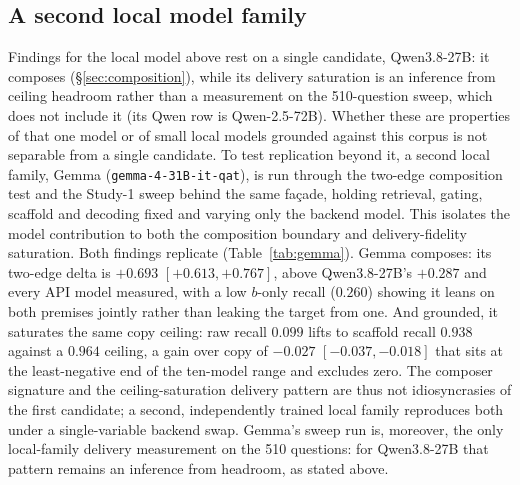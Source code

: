 \documentclass[10pt,twocolumn]{article}
\begin{document}
\subsection{A second local model family}\label{sec:gemma}
Findings for the local model above rest on a single candidate, Qwen3.8-27B: it composes
(\S\ref{sec:composition}), while its delivery saturation is an inference from ceiling headroom
rather than a measurement on the 510-question sweep, which does not include it (its Qwen row is
Qwen-2.5-72B). Whether these are properties of that one model or of small local models grounded
against this corpus is not separable from a single candidate. To test replication beyond it, a
second local family, Gemma (\texttt{gemma-4-31B-it-qat}), is run through the two-edge composition
test and the Study-1 sweep behind the same fa\c{c}ade, holding retrieval, gating, scaffold and
decoding fixed and varying only the backend model. This isolates the model contribution to both
the composition boundary and delivery-fidelity saturation. Both findings replicate
(Table~\ref{tab:gemma}). Gemma composes: its two-edge delta is $+0.693$ $[+0.613,+0.767]$, above
Qwen3.8-27B's $+0.287$ and every API model measured, with a low $b$-only recall ($0.260$) showing it
leans on both premises jointly rather than leaking the target from one. And grounded, it saturates
the same copy ceiling: raw recall $0.099$ lifts to scaffold recall $0.938$ against a $0.964$ ceiling,
a gain over copy of $-0.027$ $[-0.037,-0.018]$ that sits at the least-negative end of the ten-model
range and excludes zero. The composer signature and the ceiling-saturation delivery pattern are thus
not idiosyncrasies of the first candidate; a second, independently trained local family reproduces
both under a single-variable backend swap. Gemma's sweep run is, moreover, the only local-family
delivery measurement on the 510 questions: for Qwen3.8-27B that pattern remains an inference from
headroom, as stated above.
\end{document}
